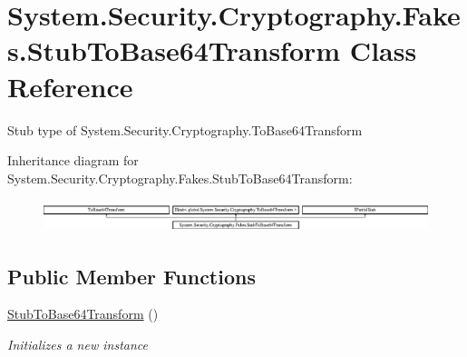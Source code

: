 \hypertarget{class_system_1_1_security_1_1_cryptography_1_1_fakes_1_1_stub_to_base64_transform}{\section{System.\-Security.\-Cryptography.\-Fakes.\-Stub\-To\-Base64\-Transform Class Reference}
\label{class_system_1_1_security_1_1_cryptography_1_1_fakes_1_1_stub_to_base64_transform}
}


Stub type of System.\-Security.\-Cryptography.\-To\-Base64\-Transform 


Inheritance diagram for System.\-Security.\-Cryptography.\-Fakes.\-Stub\-To\-Base64\-Transform\-:\begin{figure}[H]
\begin{center}
\leavevmode
\includegraphics[height=0.933333cm]{class_system_1_1_security_1_1_cryptography_1_1_fakes_1_1_stub_to_base64_transform}
\end{center}
\end{figure}
\subsection*{Public Member Functions}
\begin{DoxyCompactItemize}
\item 
\hyperlink{class_system_1_1_security_1_1_cryptography_1_1_fakes_1_1_stub_to_base64_transform_a72036c256ad59c2a67242854c6884385}{Stub\-To\-Base64\-Transform} ()
\begin{DoxyCompactList}\small\item\em Initializes a new instance\end{DoxyCompactList}\end{DoxyCompactItemize}
